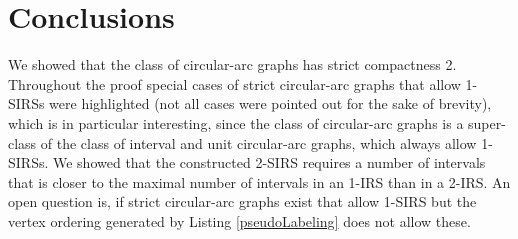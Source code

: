 \documentclass[10pt]{article}
\begin{document}
\section{Conclusions}\label{conc}

We showed that the class of circular-arc graphs has strict compactness 2.
Throughout the proof special cases of strict circular-arc graphs that allow 
1-SIRSs were highlighted (not all cases were pointed out for the sake of brevity), which is in particular interesting, since the class of circular-arc graphs is a super-class of the class of interval and unit circular-arc graphs, which always allow 1-SIRSs.
We showed
that the constructed 2-SIRS requires a number of intervals that is 
closer to the maximal number of intervals in an 1-IRS than in a 2-IRS. 
An open question is, if strict circular-arc graphs exist that allow 1-SIRS but the vertex ordering generated by
Listing \ref{pseudoLabeling} does not allow these.













































\end{document}
